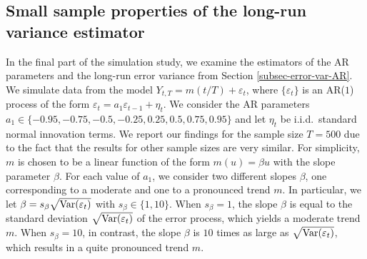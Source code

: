 \subsection{Small sample properties of the long-run variance estimator}\label{subsec-sim-3}


In the final part of the simulation study, we examine the estimators of the AR parameters and the long-run error variance from Section \ref{subsec-error-var-AR}. We simulate data from the model $Y_{t,T} = m(t/T) + \varepsilon_t$, where $\{ \varepsilon_t\}$ is an AR($1$) process of the form $\varepsilon_t = a_1 \varepsilon_{t-1} + \eta_t$. We consider the AR parameters $a_1 \in \{-0.95,-0.75,-0.5,-0.25,0.25,0.5,0.75,0.95\}$ and let $\eta_t$ be i.i.d.\ standard normal innovation terms. We report our findings for the sample size $T=500$ due to the fact that the results for other sample sizes are very similar. For simplicity, $m$ is chosen to be a linear function of the form $m(u) = \beta u$ with the slope parameter $\beta$. For each value of $a_1$, we consider two different slopes $\beta$, one corresponding to a moderate and one to a pronounced trend $m$. 
In particular, we let $\beta = s_\beta \sqrt{\textnormal{Var}(\varepsilon_t)}$ with $s_\beta \in \{1,10\}$. When $s_\beta = 1$, the slope $\beta$ is equal to the standard deviation $\sqrt{\textnormal{Var}(\varepsilon_t)}$ of the error process, which yields a moderate trend $m$. When $s_\beta = 10$, in contrast, the slope $\beta$ is $10$ times as large as $\sqrt{\textnormal{Var}(\varepsilon_t)}$, which results in a quite pronounced trend $m$. 

